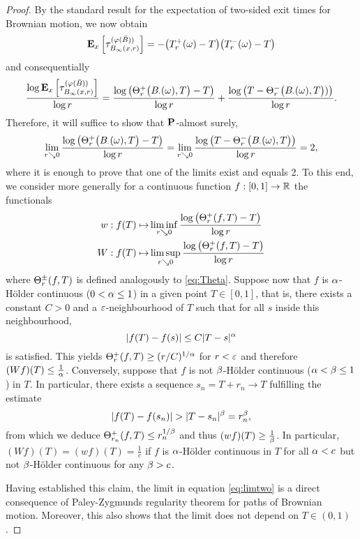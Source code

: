 \begin{proof}
  By the standard result for the expectation of two-sided exit times for Brownian motion, we now obtain 
  \[
    \PTEp{\tau_{B_\infty(x,r)}^{(\gp(\bar B))}}{x}=-\big(T^+_r(\go)-T\big)\big(T^-_r(\go)-T\big)
  \]
  and consequentially
  \[
    \frac{\log  \PTEp{\tau_{B_\infty(x,r)}^{(\gp(\bar B))}}{x}}{\log r}
    =\frac{\log \big(\gT^+_r\big(B_\cdot(\go),T\big)-T\big)}{\log r}
     +\frac{\log \big(T-\gT^-_r\big(B_\cdot(\go),T\big))\big)}{\log r}.
  \]
  Therefore, it will suffice to show that $\Prob$-almost surely, 
  \begin{equation}\label{eq:limtwo}
    \lim_{r\searrow 0}\frac{\log \big(\gT^+_r\big(B_\cdot(\go),T\big)-T\big)}{\log r}
    =\lim_{r\searrow 0}\frac{\log \big(T-\gT^-_r\big(B_\cdot(\go),T\big)\big)}{\log r}=2,
  \end{equation}
  where it is enough to prove that one of the limits exist and equals 2. To this end, we consider more generally for a continuous function $f:[0,1]\to \IR$ the functionals
  \begin{align*}
    w:f(T)\mapsto &\liminf_{r\searrow0}\frac{\log\big(\gT^+_r(f,T)-T\big)}{\log r}\\
    W:f(T)\mapsto &\limsup_{r\searrow0}\frac{\log\big(\gT^+_r(f,T)-T\big)}{\log r}
  \end{align*}
  where $\gT^\pm_r(f,T)$ is defined analogously to \eqref{eq:Theta}. Suppose now that $f$ is $\ga$-H\"{o}lder 
  continuous ($0<\ga\leq 1$) in a given point $T\in[0,1]$, that is, there exists a constant $C>0$ and a 
  $\gep$-neighbourhood of $T$ such that for all $s$ inside this neighbourhood,
  \[
    |f(T)-f(s)|\leq C|T-s|^\ga
  \]
  is satisfied. This yields $\gT^+_r(f,T)\geq (r/C)^{1/\ga}$ for $r<\gep$ and therefore $(Wf)(T)\leq \frac{1}{\ga}$. Conversely, suppose that $f$ is not $\gb$-H\"{o}lder continuous ($\ga<\gb\leq 1$) in $T$. In particular, there exists a sequence $s_n=T+r_n\to T$ fulfilling the estimate 
  \[
    |f(T)-f(s_n)|>|T-s_n|^\gb=r_n^\gb,
  \]
  from which we deduce $\gT^+_{r_n}(f,T)\leq r_n^{1/\gb}$ and thus $(wf)(T)\geq\frac{1}{\gb}$. In particular, 
  $(Wf)(T)=(wf)(T)=\frac{1}{c}$ if $f$ is $\ga$-H\"{o}lder continuous in $T$ for all $\ga<c$ but not $\gb$-H\"{o}lder continuous for any $\gb>c$. 
  
  Having established this claim, the limit in equation \eqref{eq:limtwo} is a direct consequence of Paley-Zygmunds regularity theorem for paths of Brownian motion. Moreover, this also shows that the limit does not depend on $T\in(0,1)$. 
\end{proof}

